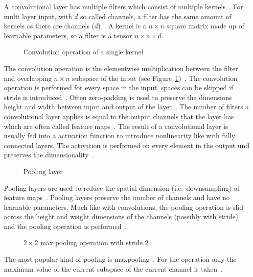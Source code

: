 A convolutional layer has multiple filters which consist of multiple kernels~\citep{chauhan_review_2018}.
For multi layer input, with $d$ so called channels, a filter has the same amount of kernels as there
are channels ($d$)~\citep{ponti_everything_2017}.
A kernel is a $n\times n$ square matrix made up of learnable parameters, so a filter is a tensor
$n\times n\times d$.
\begin{figure}[ht]
    \centering
    
    \caption{Convolution operation of a single kernel~\citep{chauhan_review_2018}\label{fig:conv-layer}}
\end{figure}
The convolution operation is the elementwise multiplication between the filter and overlapping
$n\times n$ subspace of the input (see Figure~\ref{fig:conv-layer})~\citep{ponti_everything_2017}.
The convolution operation is performed for every space in the input, spaces can be skipped if
stride is introduced~\citep{ponti_everything_2017}.
Often zero-padding is used to preserve the dimensions height and width between input and output of
the layer~\citep{ponti_everything_2017}.
The number of filters a convolutional layer applies is equal to the output channels that the layer
has which are often called feature maps~\citep{ponti_everything_2017}.
The result of a convolutional layer is usually fed into a activation function to introduce
nonlinearity like with fully connected layers.
The activation is performed on every element in the output und preserves the
dimensionality~\citep{ponti_everything_2017}.

\begin{figure}[h]
    \centering
    \caption{Pooling layer~\citep{chauhan_review_2018}\label{fig:pool-layer}}
\end{figure}
Pooling layers are used to reduce the spatial dimension (i.e.\ downsampling) of feature
maps~\citep{ponti_everything_2017}.
Pooling layers preserve the number of channels and have no learnable parameters. %
Much like with convolutions, the pooling operation is slid across the height and weight dimensions
of the channels (possibly with stride) and the pooling operation is
performed~\citep{ponti_everything_2017,chauhan_review_2018}.
\begin{figure}[ht]
    \centering
    \caption{$2\times 2$ max pooling operation with stride
        2~\citep{chauhan_review_2018}\label{fig:pool-layer}}
\end{figure}
The most popular kind of pooling is maxpooling~\citep{ponti_everything_2017}.
For the operation only the maximum value of the current subspace of the current channel is
taken~\citep{chauhan_review_2018}.

